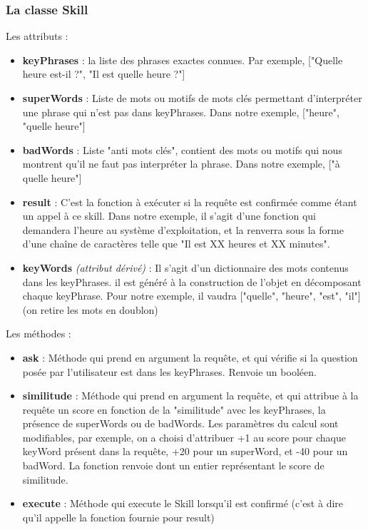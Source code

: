 \documentclass[a4paper,10pt]{report}
\begin{document}
        \subsubsection{La classe Skill}

          {Les attributs :}
          \begin{itemize}
            \item \textbf{keyPhrases} : la liste des phrases exactes connues. Par exemple, ["Quelle heure est-il ?", "Il est quelle heure ?"]
            \item \textbf{superWords} : Liste de mots ou motifs de mots clés permettant d'interpréter une phrase qui n'est pas dans keyPhrases. Dans notre exemple, ["heure", "quelle heure"]
            \item \textbf{badWords} : Liste "anti mots clés", contient des mots ou motifs qui nous montrent qu'il ne faut pas interpréter la phrase. Dans notre exemple, ["à quelle heure"]
            \item \textbf{result} : C'est la fonction à exécuter si la requête est confirmée comme étant un appel à ce skill. Dans notre exemple, il s'agit d'une fonction qui demandera l'heure au système d'exploitation, et la renverra sous la forme d'une chaîne de caractères telle que "Il est XX heures et XX minutes".
            \item \textbf{keyWords} \textit{(attribut dérivé)} : Il s'agit d'un dictionnaire des mots contenus dans les keyPhrases. il est généré à la construction de l'objet en décomposant chaque keyPhrase. Pour notre exemple, il vaudra ["quelle", "heure", "est", "il"] (on retire les mots en doublon)\newline
          \end{itemize}
          {Les méthodes :}
          \begin{itemize}
            \item \textbf{ask} : Méthode qui prend en argument la requête, et qui vérifie si la question posée par l'utilisateur est dans les keyPhrases. Renvoie un booléen.
            \item \textbf{similitude} : Méthode qui prend en argument la requête, et qui attribue à la requête un score en fonction de la "similitude" avec les keyPhrases, la présence de superWords ou de badWords. Les paramètres du calcul sont modifiables, par exemple, on a choisi d'attribuer +1 au score pour chaque keyWord présent dans la requête, +20 pour un superWord, et -40 pour un badWord. La fonction renvoie dont un entier représentant le score de similitude.
            \item \textbf{execute} : Méthode qui execute le Skill lorsqu'il est confirmé (c'est à dire qu'il appelle la fonction fournie pour result)\newline
          \end{itemize}
\end{document}
